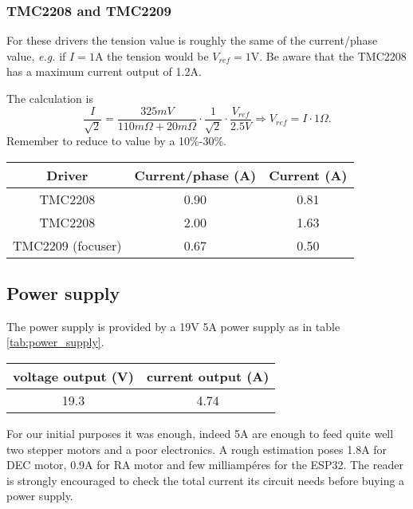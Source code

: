 \subsubsection{TMC2208 and TMC2209}
For these drivers the tension value is roughly the same of the current/phase value, \textit{e.g.} if \(I=1\)A the tension would be \(V_{ref}=1\)V.
Be aware that the TMC2208 has a maximum current output of 1.2A.

The calculation is 
\[\frac{I}{\sqrt{2}}=\frac{325mV}{110m\Omega+20m\Omega}\cdot\frac{1}{\sqrt{2}}\cdot\frac{V_{ref}}{2.5V}\Rightarrow V_{ref} = I \cdot 1\Omega.\]
Remember to reduce to value by a 10\%-30\%.

\begin{minipage}
    {.4\textwidth}
    \begin{tabular}{ccc}
       Driver & Current/phase (A) & Current (A) \\
        \hline
       TMC2208 & 0.90 & 0.81 \\
       TMC2208 & 2.00 & 1.63 \\                
       TMC2209 (focuser) & 0.67 & 0.50                
    \end{tabular}
    \label{tab:drivers_curr}
\end{minipage} 

\subsection{Power supply}
The power supply is provided by a 19V 5A power supply as in table \ref{tab:power_supply}.

\begin{minipage}
    {.4\textwidth}
    \begin{tabular}{cc}
         voltage output (V) & current output (A) \\
         \hline
        19.3 & 4.74 \\
    \end{tabular}
    \label{tab:power_supply}
\end{minipage}

For our initial purposes it was enough, indeed 5A are enough to feed quite well two stepper motors and a poor electronics.
A rough estimation poses 1.8A for DEC motor, 0.9A for RA motor and few milliampéres for the ESP32. 
The reader is strongly encouraged to check the total current its circuit needs before buying a power supply.

